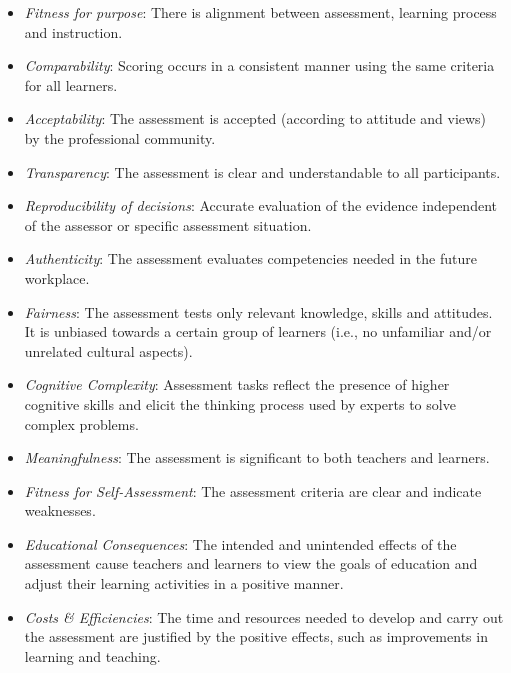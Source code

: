 \begin{itemize}
\item \emph{Fitness for purpose}: There is alignment between assessment, learning process and instruction.

\item \emph{Comparability}: Scoring occurs in a consistent manner using the same criteria for all learners.

\item \emph{Acceptability}: The assessment is accepted (according to attitude and views) by the professional community.

\item \emph{Transparency}: The assessment is clear and understandable to all participants. 

\item \emph{Reproducibility of decisions}: Accurate evaluation of the evidence independent of the assessor or specific assessment situation. 

\item \emph{Authenticity}: The assessment evaluates competencies needed in the future workplace.

\item \emph{Fairness}: The assessment tests only relevant knowledge, skills and attitudes. It is unbiased towards a certain group of learners (i.e., no unfamiliar and/or unrelated cultural aspects).

\item \emph{Cognitive Complexity}: Assessment tasks reflect the presence of higher cognitive skills and elicit the thinking process used by experts to solve complex problems.

\item \emph{Meaningfulness}: The assessment is significant to both teachers and learners. 

\item \emph{Fitness for Self-Assessment}: The assessment criteria are clear and indicate weaknesses.

\item \emph{Educational Consequences}: The intended and unintended effects of the assessment cause teachers and learners to view the goals of education and adjust their learning activities in a positive manner.

\item \emph{Costs \& Efficiencies}: The time and resources needed to develop and carry out the assessment are justified by the positive effects, such as improvements in learning and teaching.

\end{itemize}



